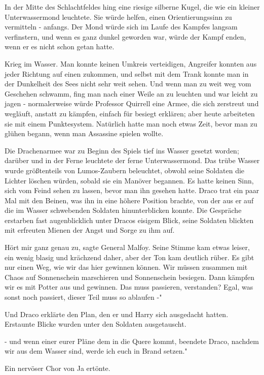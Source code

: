 In der Mitte des Schlachtfeldes hing eine riesige silberne Kugel, die wie ein
kleiner Unterwassermond leuchtete. Sie würde helfen, einen Orientierungssinn zu
vermitteln - anfangs. Der Mond würde sich im Laufe des Kampfes langsam
verfinstern, und wenn es ganz dunkel geworden war, würde der Kampf enden, wenn
er es nicht schon getan hatte.

Krieg im Wasser. Man konnte keinen Umkreis verteidigen, Angreifer konnten aus
jeder Richtung auf einen zukommen, und selbst mit dem Trank konnte man in der
Dunkelheit des Sees nicht sehr weit sehen. Und wenn man zu weit weg vom
Geschehen schwamm, fing man nach einer Weile an zu leuchten und war leicht zu
jagen - normalerweise würde Professor Quirrell eine Armee, die sich zerstreut
und wegläuft, anstatt zu kämpfen, einfach für besiegt erklären; aber heute
arbeiteten sie mit einem Punktesystem. Natürlich hatte man noch etwas Zeit,
bevor man zu glühen begann, wenn man Assassine spielen wollte.

Die Drachenarmee war zu Beginn des Spiels tief ins Wasser gesetzt worden;
darüber und in der Ferne leuchtete der ferne Unterwassermond. Das trübe Wasser
wurde größtenteils von Lumos-Zaubern beleuchtet, obwohl seine Soldaten die
Lichter löschen würden, sobald sie ein Manöver begannen. Es hatte keinen Sinn,
sich vom Feind sehen zu lassen, bevor man ihn gesehen hatte. Draco trat ein paar
Mal mit den Beinen, was ihn in eine höhere Position brachte, von der aus er auf
die im Wasser schwebenden Soldaten hinunterblicken konnte. Die Gespräche
erstarben fast augenblicklich unter Dracos eisigem Blick, seine Soldaten
blickten mit erfreuten Mienen der Angst und Sorge zu ihm auf.

\glqq Hört mir ganz genau zu\grqq{}, sagte General Malfoy. Seine Stimme kam
etwas leiser, ein wenig blasig und krächzend daher, aber der Ton kam deutlich
rüber. \glqq Es gibt nur einen Weg, wie wir das hier gewinnen können. Wir müssen
zusammen mit Chaos auf Sonnenschein marschieren und Sonnenschein besiegen. Dann
kämpfen wir es mit Potter aus und gewinnen. Das muss passieren, verstanden?
Egal, was sonst noch passiert, dieser Teil muss so ablaufen -"

Und Draco erklärte den Plan, den er und Harry sich ausgedacht hatten. Erstaunte
Blicke wurden unter den Soldaten ausgetauscht.

\glqq - und wenn einer eurer Pläne dem in die Quere kommt\grqq{}, beendete
Draco, \glqq nachdem wir aus dem Wasser sind, werde ich euch in Brand setzen."

Ein nervöser Chor von \glqq Ja\grqq{} ertönte.

